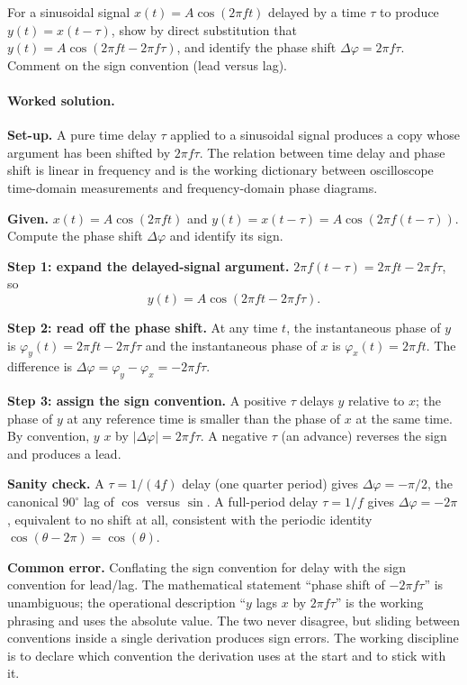 \begin{exercise}
For a sinusoidal signal $x(t) = A \cos(2\pi f t)$ delayed by a time
$\tau$ to produce $y(t) = x(t - \tau)$, show by direct substitution
that $y(t) = A \cos(2\pi f t - 2\pi f \tau)$, and identify the
phase shift $\Delta \varphi = 2\pi f \tau$. Comment on the sign
convention (lead versus lag).

\paragraph{Worked solution.}
\textbf{Set-up.} A pure time delay $\tau$ applied to a sinusoidal
signal produces a copy whose argument has been shifted by
$2\pi f \tau$. The relation between time delay and phase shift is
linear in frequency and is the working dictionary between
oscilloscope time-domain measurements and frequency-domain phase
diagrams.

\textbf{Given.} $x(t) = A \cos(2\pi f t)$ and $y(t) = x(t - \tau)
= A \cos(2\pi f (t - \tau))$. Compute the phase shift $\Delta
\varphi$ and identify its sign.

\textbf{Step 1: expand the delayed-signal argument.}
$2\pi f (t - \tau) = 2\pi f t - 2\pi f \tau$, so
\[
y(t) = A \cos(2\pi f t - 2\pi f \tau).
\]

\textbf{Step 2: read off the phase shift.} At any time $t$, the
instantaneous phase of $y$ is $\varphi_{y}(t) = 2\pi f t - 2\pi f
\tau$ and the instantaneous phase of $x$ is $\varphi_{x}(t) =
2\pi f t$. The difference is $\Delta \varphi = \varphi_{y} -
\varphi_{x} = -2\pi f \tau$.

\textbf{Step 3: assign the sign convention.} A positive $\tau$
delays $y$ relative to $x$; the phase of $y$ at any reference
time is smaller than the phase of $x$ at the same time. By
convention, $y$  $x$ by $|\Delta \varphi| = 2\pi
f \tau$. A negative $\tau$ (an advance) reverses the sign and
produces a lead.

\textbf{Sanity check.} A $\tau = 1/(4 f)$ delay (one quarter
period) gives $\Delta \varphi = -\pi/2$, the canonical $90^\circ$
lag of $\cos$ versus $\sin$. A full-period delay $\tau = 1/f$
gives $\Delta \varphi = -2\pi$, equivalent to no shift at all,
consistent with the periodic identity $\cos(\theta - 2\pi) =
\cos(\theta)$.

\textbf{Common error.} Conflating the sign convention for delay
with the sign convention for lead/lag. The mathematical statement
``phase shift of $-2\pi f \tau$'' is unambiguous; the operational
description ``$y$ lags $x$ by $2\pi f \tau$'' is the working
phrasing and uses the absolute value. The two never disagree, but
sliding between conventions inside a single derivation produces
sign errors. The working discipline is to declare which convention
the derivation uses at the start and to stick with it.
\end{exercise}

